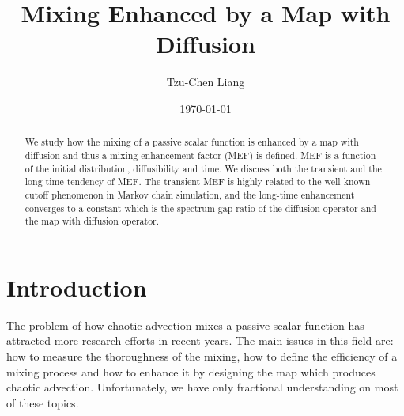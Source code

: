 \documentclass{article}
\title{Mixing Enhanced by a Map with Diffusion}
\author{Tzu-Chen Liang}
\date{\today}
\begin{document}
\maketitle

\begin{abstract}
   

We study how the mixing of a passive scalar function is enhanced by a map with
diffusion and thus a mixing enhancement factor (MEF) is defined. MEF
is a function of the initial distribution, diffusibility and time.
We discuss both the transient and the long-time tendency of MEF. The
transient MEF is highly related to the well-known cutoff phenomenon
in Markov chain simulation, and the long-time enhancement converges
to a constant which is the spectrum gap ratio of the diffusion
operator and the map with diffusion operator.


\end{abstract}

\section{Introduction}
\label{Introduction}
The problem of how chaotic advection mixes a passive scalar function has attracted more research efforts in recent years\cite{Ottino2004}. The main issues in this field are: how to measure the thoroughness of the mixing, how to define the efficiency of a mixing process and how to enhance it by designing the map which produces chaotic advection. Unfortunately, we have only fractional understanding on most of these topics.
\end{document}
